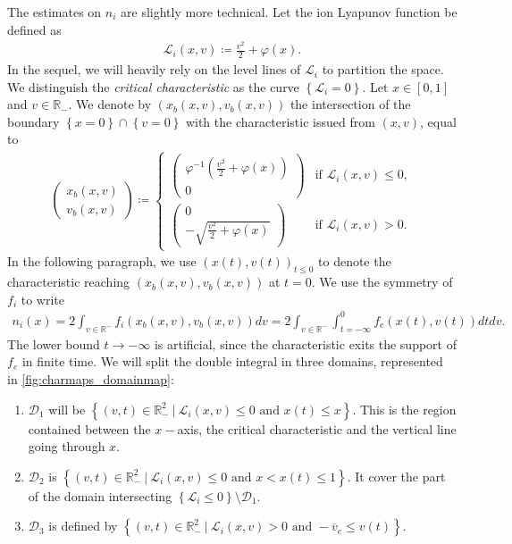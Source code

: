 \documentclass{article}
\numberwithin{equation}{section}
\newcommand{\vv}[1]{\begin{pmatrix} #1 \end{pmatrix}} %
\newcommand{\ve}{{\overline{v}_e}} %
\newcommand{\DomUpL}{{\mathcal{D}_1}} %
\newcommand{\DomUpR}{{\mathcal{D}_2}} %
\newcommand{\DomLow}{{\mathcal{D}_3}} %
\begin{document}
The estimates on $n_i$ are slightly more technical. Let the ion Lyapunov function be defined as
\begin{align}\label{eq:def_Li}
	\mathcal{L}_i(x,v) \coloneqq \frac{v^2}{2} + \varphi(x).
\end{align}
In the sequel, we will heavily rely on the level lines of $\mathcal{L}_i$ to partition the space. We distinguish the \emph{critical characteristic} as the curve $\left\{\mathcal{L}_i = 0\right\}$.
Let $x\in[0,1]$ and $v \in \mathbb{R}_{-}$. We denote by $(x_b(x,v),v_b(x,v))$ the intersection of the boundary $\left\{x=0\right\}\cap\left\{v=0\right\}$ with the characteristic issued from $(x,v)$, equal to
\begin{align*}
	\vv{x_b(x,v) \\ v_b(x,v)} \coloneqq 
	\begin{cases}
		\vv{\varphi^{-1}\left(\frac{v^2}{2} + \varphi(x)\right) \\ 0} & \text{if } \mathcal{L}_i(x,v) \leqslant 0, \\
		\vv{0 \\ - \sqrt{\frac{v^2}{2} + \varphi(x)}} & \text{if } \mathcal{L}_i(x,v) > 0.
	\end{cases}
\end{align*}
In the following paragraph, we use $(x(t),v(t))_{t\leqslant0}$ to denote the characteristic reaching $(x_b(x,v),v_b(x,v))$ at $t=0$. 
We use the symmetry of $f_i$ to write 
\begin{align*}
	n_i(x) = 2 \int_{v\in\mathbb{R}^{-}} f_i(x_b(x,v), v_b(x,v)) dv = 2 \int_{v\in\mathbb{R}^{-}}\int_{t=-\infty}^{0} f_e(x(t),v(t)) dt dv.
\end{align*}
The lower bound $t \to -\infty$ is artificial, since the characteristic exits the support of $f_e$ in finite time. We will split the double integral in three domains, represented in \cref{fig:charmaps_domainmap}:
\begin{enumerate}
\item $\DomUpL$ will be $\left\{(v,t) \in \mathbb{R}_{-}^2 \ |\ \mathcal{L}_i(x,v) \leqslant 0 \text{ and } x(t) \leqslant x \right\}$. This is the region contained between the $x-$axis, the critical characteristic and the vertical line going through $x$.
\item $\DomUpR$ is $\left\{(v,t) \in \mathbb{R}_{-}^2 \ |\ \mathcal{L}_i(x,v) \leqslant 0 \text{ and } x < x(t) \leqslant 1 \right\}$. It cover the part of the domain intersecting $\left\{\mathcal{L}_i \leqslant 0\right\} \setminus \DomUpL$.
\item $\DomLow$ is defined by $\left\{(v,t) \in \mathbb{R}_{-}^2 \ |\ \mathcal{L}_i(x,v) > 0 \text{ and } -\ve \leqslant v(t) \right\}$. 
\end{enumerate}
\end{document}
